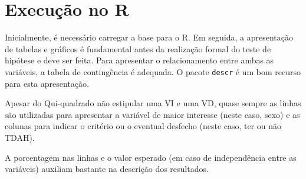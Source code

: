 \documentclass[
]{book}
\newenvironment{Shaded}{\begin{snugshade}}{\end{snugshade}}
\newcommand{\AttributeTok}[1]{\textcolor[rgb]{0.77,0.63,0.00}{#1}}
\newcommand{\FunctionTok}[1]{\textcolor[rgb]{0.00,0.00,0.00}{#1}}
\newcommand{\NormalTok}[1]{#1}
\newcommand{\SpecialCharTok}[1]{\textcolor[rgb]{0.00,0.00,0.00}{#1}}
\begin{document}
\hypertarget{execuuxe7uxe3o-no-r-1}{%
\section{Execução no R}\label{execuuxe7uxe3o-no-r-1}}

Inicialmente, é necessário carregar a base para o R. Em seguida, a apresentação de tabelas e gráficos é fundamental antes da realização formal do teste de hipótese e deve ser feita. Para apresentar o relacionamento entre ambas as variáveis, a tabela de contingência é adequada. O pacote \texttt{descr} é um bom recurso para esta apresentação.

Apesar do Qui-quadrado não estipular uma VI e uma VD, quase sempre as linhas são utilizadas para apresentar a variável de maior interesse (neste caso, sexo) e as colunas para indicar o critério ou o eventual desfecho (neste caso, ter ou não TDAH).

A porcentagem nas linhas e o valor esperado (em caso de independência entre as variáveis) auxiliam bastante na descrição dos resultados.

\begin{Shaded}
\end{Shaded}
\end{document}

